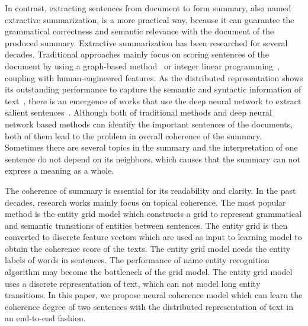 \documentclass[letterpaper]{article} %
\begin{document}
	In contrast, extracting sentences from document to form summary, also named extractive summarization, is a more practical way, because it can guarantee the grammatical correctness and semantic relevance with the document of the produced summary. Extractive summarization has been researched for several decades. Traditional approaches mainly focus on scoring sentences of the document by using a graph-based method~\cite{graph_based} or integer linear programming~\cite{ilp}, coupling with human-engineered features. As the distributed representation shows its outstanding performance to capture the semantic and syntactic information of text~\cite{word2vec,nc_baotian}, there is an emergence of works that use the deep neural network to extract salient sentences~\cite{SummaRuNNer,nayeem2017extract,jianpeng2016}. Although both of traditional methods and deep neural network based methods can identify the important sentences of the documents, both of them lead to the problem in overall coherence of the summary. Sometimes there are several topics in the summary and the interpretation of one sentence do not depend on its neighbors, which causes that the summary can not express a meaning as a whole. 
	
	The coherence of summary is essential for its readability and clarity. In the past decades, research works mainly focus on topical coherence. The most popular method is the entity grid model\cite{entitygrid} which constructs a grid to represent grammatical and semantic transitions of entities between sentences. The entity grid is then converted to discrete feature vectors which are used as input to learning model to obtain the coherence score of the texts\cite{nlcm}. The entity grid model needs the entity labels of words in sentences. The performance of name entity recognition algorithm may become the bottleneck of the grid model. The entity grid model uses a discrete representation of text, which can not model long entity transitions. In this paper, we propose neural coherence model which can learn the coherence degree of two sentences with the distributed representation of text in an end-to-end fashion.
	
\end{document}
